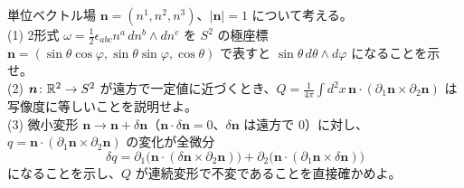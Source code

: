 \begin{problem}[難易度 B]\label{ch03-prob-degint}
単位ベクトル場 $\bm n=(n^1,n^2,n^3)$、$\lvert\bm n\rvert=1$ について考える。\\
(1) 2形式 $\omega=\frac12\epsilon_{abc}n^a\,dn^b\wedge dn^c$ を $S^2$ の極座標 $\bm n=(\sin\theta\cos\varphi,\sin\theta\sin\varphi,\cos\theta)$ で表すと $\sin\theta\,d\theta\wedge d\varphi$ になることを示せ。\\
(2) $\bm n\colon\mathbb{R}^2\to S^2$ が遠方で一定値に近づくとき、$Q=\frac1{4\pi}\int d^2x\,\bm n\cdot(\partial_1\bm n\times\partial_2\bm n)$ は写像度に等しいことを説明せよ。\\
(3) 微小変形 $\bm n\to\bm n+\delta\bm n$（$\bm n\cdot\delta\bm n=0$、$\delta\bm n$ は遠方で $0$）に対し、$q=\bm n\cdot(\partial_1\bm n\times\partial_2\bm n)$ の変化が全微分
\[
\delta q=\partial_1\bigl(\bm n\cdot(\delta\bm n\times\partial_2\bm n)\bigr)+\partial_2\bigl(\bm n\cdot(\partial_1\bm n\times\delta\bm n)\bigr)
\]
になることを示し、$Q$ が連続変形で不変であることを直接確かめよ。
\end{problem}

